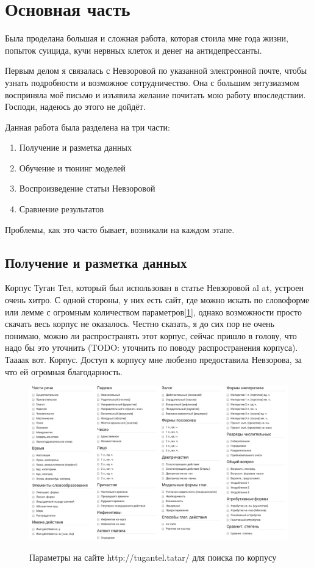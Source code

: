 \section{Основная часть}

Была проделана большая и сложная работа, которая стоила мне года жизни, попыток суицида, кучи нервных клеток и денег на антидепрессанты.

Первым делом я связалась с Невзоровой по указанной электронной почте, чтобы узнать подробности и возможное сотрудничество. Она с большим энтузиазмом восприняла моё письмо и изъявила желание почитать мою работу впоследствии. Господи, надеюсь до этого не дойдёт.

Данная работа была разделена на три части: 

\begin{enumerate}
\item Получение и разметка данных
\item Обучение и тюнинг моделей
\item Воспроизведение статьи Невзоровой
\item Сравнение результатов
\end{enumerate}

Проблемы, как это часто бывает, возникали на каждом этапе.

\subsection{Получение и разметка данных}

Корпус Туган Тел, который был использован в статье Невзоровой al at, устроен очень хитро. С одной стороны, у них есть сайт, где можно искать по словоформе или лемме с огромным количеством параметров[\ref{fig:tugan_tel_1}], однако возможности просто скачать весь корпус не оказалось. Честно сказать, я до сих пор не очень понимаю, можно ли распространять этот корпус, сейчас пришло в голову, что надо бы это уточнить (TODO: уточнить по поводу распространения корпуса). Таааак вот. Корпус. Доступ к корпусу мне любезно предоставила Невзорова, за что ей огромная благодарность.

\begin{figure}[h]
\caption{Параметры на сайте http://tugantel.tatar/ для поиска по корпусу}
\includegraphics[width=\textwidth]{pics/tugan_tel_1}
\label{fig:tugan_tel_1}
\end{figure}

